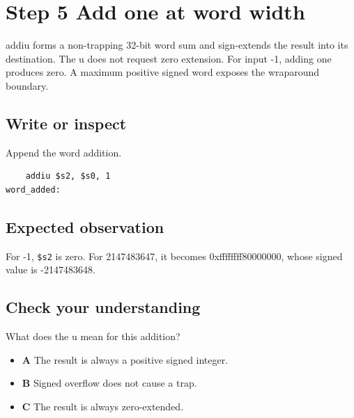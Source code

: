 \section{Step 5 Add one at word
  width}\label{004-bit-inspector-s05-step-5-add-one-at-word-width}

addiu forms a non-trapping 32-bit word sum and sign-extends the result
into its destination. The u does not request zero extension. For input
-1, adding one produces zero. A maximum positive signed word exposes the
wraparound boundary.

\subsection{Write or
  inspect}\label{004-bit-inspector-s05-write-or-inspect}

Append the word addition.

\begin{verbatim}
    addiu $s2, $s0, 1
word_added:
\end{verbatim}

\subsection{Expected
  observation}\label{004-bit-inspector-s05-expected-observation}

For -1, \texttt{\$s2} is zero. For 2147483647, it becomes
0xffffffff80000000, whose signed value is -2147483648.

\subsection{Check your
  understanding}\label{004-bit-inspector-s05-check-your-understanding}

What does the u mean for this addition?

\begin{itemize}
  \tightlist
  \item
        \textbf{A} The result is always a positive signed integer.
  \item
        \textbf{B} Signed overflow does not cause a trap.
  \item
        \textbf{C} The result is always zero-extended.
\end{itemize}
